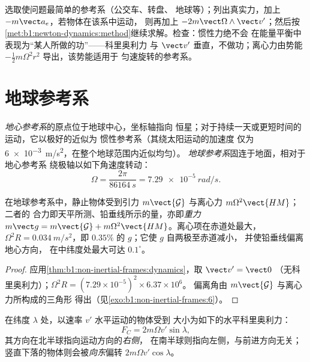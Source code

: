 \begin{method}[在非惯性参考系中求解]\label{met:b1:non-inertial-frames:method}
选取使问题最简单的参考系（公交车、转盘、
地球等）；列出真实力，加上 $-m\vect a_e$，若物体在该系中运动，
则再加上 $-2m\vect\Omega\wedge\vect v'$；然后按
\cref{met:b1:newton-dynamics:method}继续求解。检查：惯性力绝不会
在能量平衡中表现为“某人所做的功”——科里奥利力
与 $\vect v'$ 垂直，不做功；离心力由势能
$-\tfrac12 m\Omega^2r^2$ 导出，该势能适用于
匀速旋转的参考系。
\end{method}

\section{地球参考系}

\begin{definition}[地心参考系与地球参考系]\label{def:b1:non-inertial-frames:earth}
\emph{地心参考系}的原点位于地球中心，坐标轴指向
恒星；对于持续一天或更短时间的运动，它以极好的近似为
惯性参考系（其绕太阳运动的加速度
仅为 \qty{6e-3}{m/s^2}，在整个地球范围内近似均匀）。
\emph{地球参考系}固连于地面，相对于地心参考系
绕极轴以如下角速度转动：
\[
\Omega = \frac{2\pi}{\qty{86164}{s}} = \qty{7.29e-5}{rad/s} .
\]
\end{definition}

\begin{proposition}[重力，以及 $g$ 的变化]\label{prop:b1:non-inertial-frames:weight}
在地球参考系中，静止物体受到引力
$m\vect{\mathcal G}$ 与离心力 $m\Omega^2\vect{HM}$；二者的
合力即天平所测、铅垂线所示的量，亦即\emph{重力}
$m\vect g = m\vect{\mathcal G} + m\Omega^2\vect{HM}$。离心项在赤道处最大，
$\Omega^2R = \qty{0.034}{m/s^2}$，即 $0.35\%$ 的 $g$；它使 $g$ 自两极至赤道减小，
并使铅垂线偏离地心方向，
在中纬度处最大可达 $0.1^\circ$。
\end{proposition}

\begin{proof}
应用\cref{thm:b1:non-inertial-frames:dynamics}，取 $\vect v' = \vect 0$
（无科里奥利力）；$\Omega^2R = (7.29\times10^{-5})^2 \times 6.37\times10^6$。
偏离角由 $m\vect{\mathcal G}$ 与离心力所构成的三角形
得出（见\cref{exo:b1:non-inertial-frames:6}）。
\end{proof}

\begin{proposition}[地球上的科里奥利力]\label{prop:b1:non-inertial-frames:coriolis}
在纬度 $\lambda$ 处，以速率 $v'$ 水平运动的物体受到
大小为如下的水平科里奥利力：
\[
F_C = 2m\Omega v'\sin\lambda ,
\]
其方向在北半球指向运动方向的\emph{右侧}，
在南半球则指向左侧，与前进方向无关；
竖直下落的物体则会被\emph{向东}偏转 $2m\Omega v'\cos\lambda$。
\end{proposition}

